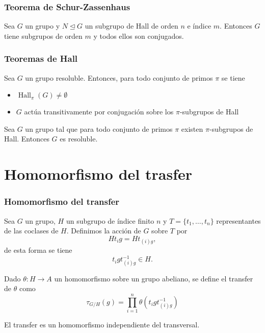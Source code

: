 \documentclass[
	11pt, %
]{beamer}
\DeclareMathOperator{\HallSubgroup}{Hall}
\newcommand{\Hall}[2]{\HallSubgroup_{#1}(#2)}
\newcommand{\norm}{\trianglelefteq}
\newcommand{\homo}[3]{#1\colon #2\to #3}
\newcommand{\transversal}[2]{\{#1_1,\ldots,#1_#2\}}
\newcommand{\transfer}[2]{\tau_{#1/ #2}}
\begin{document}
\begin{frame}
	\frametitle{Teorema de Schur-Zassenhaus}
	
	\begin{theorem}
		Sea $G$ un grupo y $N\norm G$ un subgrupo de Hall de orden $n$ e índice $m$. Entonces $G$ tiene subgrupos de orden $m$ y todos ellos son conjugados.
	\end{theorem}
 
 \end{frame}

\begin{frame}
	\frametitle{Teoremas de Hall}
	
	\begin{theorem}
		Sea $G$ un grupo resoluble. Entonces, para todo conjunto de primos $\pi$ se tiene
		\begin{itemize}
			 \item $\Hall \pi G \neq \emptyset$
			 \item $G$ actúa transitivamente por conjugación sobre los $\pi$-subgrupos de Hall
		\end{itemize}
	\end{theorem}
	
	\begin{theorem}
		Sea $G$ un grupo tal que para todo conjunto de primos $\pi$ existen $\pi$-subgrupos de Hall. Entonces $G$ es resoluble.
	\end{theorem}
	
\end{frame}



\section{Homomorfismo del trasfer}

\begin{frame}
	\frametitle{Homomorfismo del transfer}
	Sea $G$ un grupo, $H$ un subgrupo de índice finito $n$ y $T = \transversal t n$ representantes de las coclases de $H$.
	Definimos la acción de $G$ sobre $T$ por
	$$
		Ht_i g = Ht_{(i)g},
	$$
	de esta forma se tiene
	$$
		t_igt_{(i)g}^{-1}\in H.
	$$
	
	Dado $\homo \theta H A$ un homomorfismo sobre un grupo abeliano, se define el transfer de $\theta$ como
	$$
		{\transfer G H}(g) = \prod_{i=1}^n \theta\left(t_igt_{(i)g}^{-1}\right)
	$$
	
	El transfer es un homomorfismo independiente del transversal.
\end{frame}
\end{document}
